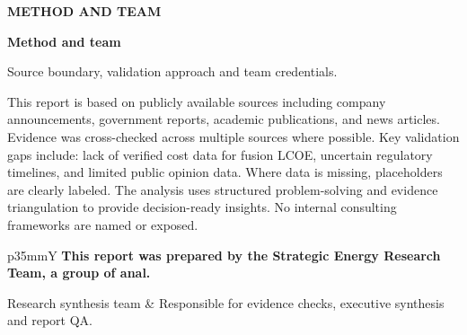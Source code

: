 \documentclass[10pt,a4paper]{article}
\begin{document}
\clearpage
{\textcolor{BOBlue}{\scriptsize\bfseries METHOD AND TEAM}}\par\vspace{-1pt}
{\Large\sffamily\bfseries\color{BONavy} Method and team}\par\vspace{4pt}
{\small\color{BOMuted} Source boundary, validation approach and team credentials.}\par\vspace{4pt}
\vspace{2pt}{\color{BOBright}\rule{\linewidth}{1pt}}\vspace{5pt}
{\small This report is based on publicly available sources including company announcements, government reports, academic publications, and news articles. Evidence was cross-checked across multiple sources where possible. Key validation gaps include: lack of verified cost data for fusion LCOE, uncertain regulatory timelines, and limited public opinion data. Where data is missing, placeholders are clearly labeled. The analysis uses structured problem-solving and evidence triangulation to provide decision-ready insights. No internal consulting frameworks are named or exposed.}\par
\vspace{4pt}\begin{tabularx}{\linewidth}{p{35mm}Y}
{\small\bfseries This report was prepared by the Strategic Energy Research Team, a group of anal.}\par{\scriptsize\color{BOMuted} Research synthesis team} & {\scriptsize Responsible for evidence checks, executive synthesis and report QA.} \\[6pt]
\end{tabularx}
\end{document}
